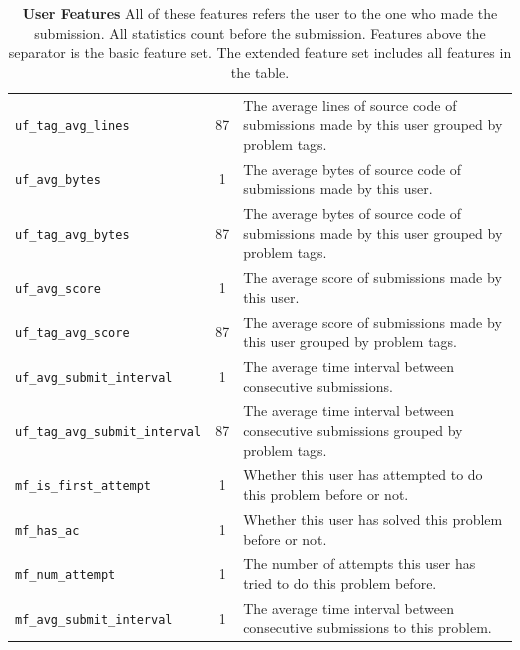 \begin{table}[hpbt]
\begin{tabular}{lcp{10cm}}
            {\footnotesize\verb|uf_tag_avg_lines|} & 87 &
                The average lines of source code of submissions made by this user grouped by problem tags.\\
            {\footnotesize\verb|uf_avg_bytes|} & 1 &
                The average bytes of source code of submissions made by this user. \\
            {\footnotesize\verb|uf_tag_avg_bytes|} & 87 &
                The average bytes of source code of submissions made by this user grouped by problem tags. \\
            {\footnotesize\verb|uf_avg_score|} & 1 &
                The average score of submissions made by this user. \\
            {\footnotesize\verb|uf_tag_avg_score|} & 87 &
                The average score of submissions made by this user grouped by problem tags. \\
            {\footnotesize\verb|uf_avg_submit_interval|} & 1 &
                The average time interval between consecutive submissions. \\
            {\footnotesize\verb|uf_tag_avg_submit_interval|} & 87 &
                The average time interval between consecutive submissions grouped by problem tags. \\
            {\footnotesize\verb|mf_is_first_attempt|} & 1 &
                Whether this user has attempted to do this problem before or not. \\
            {\footnotesize\verb|mf_has_ac|} & 1 &
                Whether this user has solved this problem before or not. \\
            {\footnotesize\verb|mf_num_attempt|} & 1 &
                The number of attempts this user has tried to do this problem before. \\
            {\footnotesize\verb|mf_avg_submit_interval|} & 1 &
                The average time interval between consecutive submissions to this problem. \\
            \hline
        \end{tabular}
        \caption[User Features]{\textbf{User Features}
            All of these features refers the user to the one who made the submission.
            All statistics count before the submission.
            Features above the separator is the basic feature set.
            The extended feature set includes all features in the table. }
        \label{table:user features}
        \end{table}

